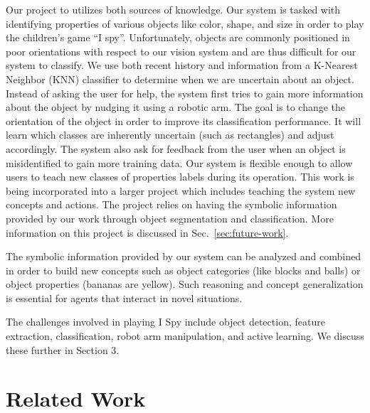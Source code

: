 \documentclass[11pt]{article}
\newcommand{\xxx}[1]{{\bf \color{red} #1}}
\begin{document}
Our project to utilizes both sources of knowledge.
Our system is tasked with identifying properties of various objects like
color, shape, and size in order to play the children's game ``I spy''.
Unfortunately, objects are commonly positioned in poor orientations with
respect to our vision system and are
thus difficult for our system to classify. We use both recent history and
information from a K-Nearest Neighbor (KNN) classifier to determine when we
are uncertain about an object. Instead of asking the user for help, the system
first tries to gain more information about the object by nudging it using a
robotic arm. The goal is to change the orientation of the object in order to
improve its classification performance. It will learn which classes are
inherently uncertain (such as rectangles) and adjust accordingly. The system also
ask for feedback from the user when an object is misidentified to gain more
training data. Our system is flexible enough to allow users to teach new
classes of properties labels during its operation. This work is being incorporated
into a larger project which includes teaching the system new concepts and actions.
The project relies on having the symbolic information provided by our work through
object segmentation and classification. More information on this project is
discussed in Sec.~\ref{sec:future-work}.

The symbolic information provided by our system can be analyzed and combined in
order to build new concepts such as object categories (like blocks and balls)
or object properties (bananas are yellow). Such reasoning and concept generalization
is essential for agents that interact in novel situations.

The challenges involved in playing I Spy include object detection, feature
extraction, classification, robot arm manipulation, and active learning. We
discuss these further in Section 3.

\section{Related Work}
\end{document}
